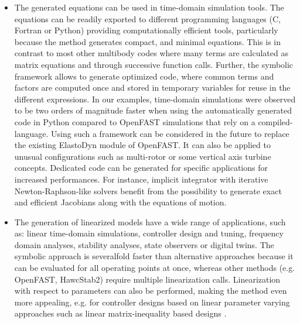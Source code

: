 \documentclass[wes, manuscript]{copernicus}
\begin{document}
\begin{itemize}
\item The generated equations can be used in time-domain simulation tools.
    The equations can be readily exported to different programming languages (C, Fortran or Python)  providing computationally efficient tools, particularly because the method generates compact, and minimal equations.
This is in contrast to most other multibody codes where many terms are calculated as matrix equations and through successive function calls.
Further, the symbolic framework allows to generate optimized code, where common terms and factors are computed once and stored in temporary variables for reuse in the different expressions.
%
In our examples, time-domain simulations were observed to be two orders of magnitude faster when using the automatically generated code in Python compared to OpenFAST simulations that rely on a compiled-language. 
%
Using such a framework can be considered in the future to replace the existing ElastoDyn module of OpenFAST.
It can also be applied to unusual configurations such as multi-rotor or some vertical axis turbine concepts. 
%
Dedicated code can be generated for specific applications for increased performances.
For instance, implicit integrator with iterative Newton-Raphson-like solvers benefit from the possibility to generate exact and efficient Jacobians along with the equations of motion.





\item The generation of linearized models have a wide range of applications, such as: linear time-domain simulations, controller design and tuning, frequency domain analyses, stability analyses, state observers or digital twins.
The symbolic approach is severalfold faster than alternative approaches because it can be evaluated for all operating points at once, whereas other methods (e.g. OpenFAST, HawcStab2) require multiple linearization calls.
Linearization with respect to parameters can also be performed, making the method even more appealing, e.g. for controller designs based on linear parameter varying approaches such as linear matrix-inequality based designs \citep{Poschke:2020}.



\end{itemize}
\end{document}
